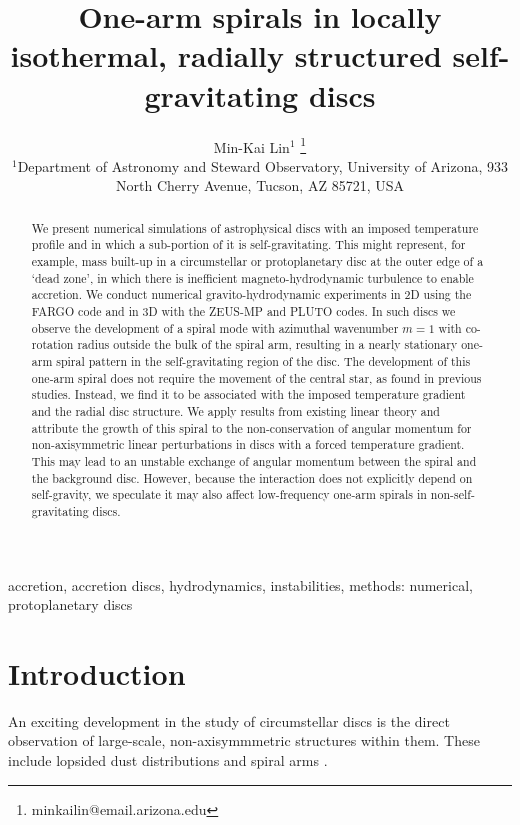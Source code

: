 \documentclass[useAMS,usenatbib]{mn2e}
\title[One-arm spirals]{One-arm spirals in 
  locally isothermal, radially structured self-gravitating discs}
\author[Lin]{Min-Kai Lin$^{1}$
  \thanks{ minkailin@email.arizona.edu} \\ 
  $^1$Department of Astronomy and Steward Observatory, University of
  Arizona, 933 North Cherry Avenue, Tucson, AZ 85721, USA 
}
\begin{document}
\maketitle
\begin{abstract} 
  We present numerical simulations of astrophysical discs with an 
  imposed temperature profile and in which a sub-portion of it is
  self-gravitating. This might represent, for example, mass  
  built-up in a circumstellar or protoplanetary
  disc at the outer edge of a `dead zone', in which there
  is inefficient magneto-hydrodynamic turbulence to enable accretion. 
  We conduct numerical gravito-hydrodynamic experiments in 2D using
  the FARGO code and in 3D with the ZEUS-MP and PLUTO codes. In such
  discs we observe the development of a 
  spiral mode with azimuthal wavenumber $m=1$ with co-rotation radius 
  outside the bulk of the spiral arm, resulting in a nearly stationary 
  one-arm spiral pattern in the self-gravitating region of the
  disc. The development of this one-arm 
  spiral does not require the movement of  
  the central star, as found in previous studies. Instead, we find it 
  to be associated with the imposed 
  temperature gradient and the radial disc structure. 
  We apply results from existing linear theory and attribute the
  growth of this spiral to the non-conservation of angular momentum
  for non-axisymmetric linear perturbations in discs with a forced temperature
  gradient. This may lead to an unstable exchange of angular momentum between the spiral 
  and the background disc. However, because the interaction does
  not explicitly depend on self-gravity, we speculate it may also
  affect low-frequency one-arm spirals in non-self-gravitating
  discs. 
\end{abstract}

\begin{keywords}
  accretion, accretion discs, hydrodynamics, instabilities, methods: numerical, protoplanetary discs 
\end{keywords}

\section{Introduction}\label{intro}
An exciting development in the study of circumstellar 
discs is the direct observation of large-scale, non-axisymmmetric
structures within them. These
include lopsided dust distributions 
\citep{marel13,fukagawa13,casassus13,isella13,perez14,follette14} and
spiral arms 
\citep{muto12,grady13,christiaens14,avenhaus14,boccaletti14}. 
\end{document}
